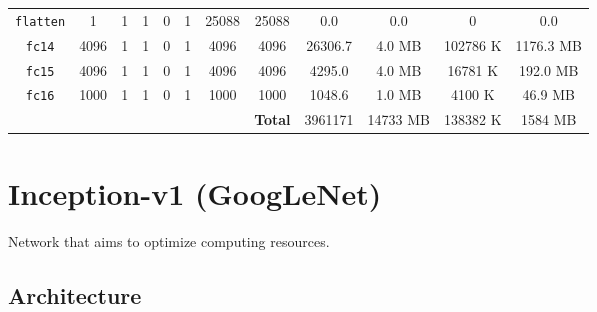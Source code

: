 \begin{table}[H]
\begin{tabular}{cccccccccccc}
        \cmidrule(lr){1-12}
        \texttt{flatten} & 1    & 1  & 1  & 0  & 1   & \num{25088} & \num{25088}   & \num{0.0}      & \num{0.0}               & \num{0}                & \num{0.0}                \\
        \texttt{fc14}    & 4096 & 1  & 1  & 0  & 1   & \num{4096}  & \num{4096}    & \num{26306.7}  & \num{4.0} {\tiny MB}    & \num{102786} {\tiny K} & \num{1176.3} {\tiny MB}  \\
        \texttt{fc15}    & 4096 & 1  & 1  & 0  & 1   & \num{4096}  & \num{4096}    & \num{4295.0}   & \num{4.0} {\tiny MB}    & \num{16781} {\tiny K}  & \num{192.0} {\tiny MB}   \\
        \texttt{fc16}    & 1000 & 1  & 1  & 0  & 1   & \num{1000}  & \num{1000}    & \num{1048.6}   & \num{1.0} {\tiny MB}    & \num{4100} {\tiny K}   & \num{46.9} {\tiny MB}    \\
        \midrule
        &&&&&&& \textbf{Total} & \num{3961171} & \num{14733} {\tiny MB} & \num{138382} {\tiny K} & \num{1584} {\tiny MB} \\
        \bottomrule
    \end{tabular}
\end{table}



\section{Inception-v1 (GoogLeNet)}

Network that aims to optimize computing resources.


\subsection{Architecture}

